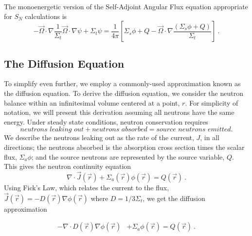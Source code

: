 The monoenergetic version of the Self-Adjoint Angular Flux equation appropriate for $S_N$ calculations is 
\begin{equation}
    - \vec{\Omega} \cdot \nabla \frac{1}{\Sigma_t}\vec{\Omega} \cdot \nabla \psi + \Sigma_t \psi = \frac{1}{4\pi}[\Sigma_s\phi + Q - \vec{\Omega} \cdot \nabla \frac{(\Sigma_s\phi + Q)}{\Sigma_t}]\:.
    \label{eq:SAAF}
\end{equation}


\subsection{The Diffusion Equation}
To simplify even further, we employ a commonly-used approximation known as the diffusion equation. To derive the diffusion equation, we consider the neutron balance within an infinitesimal volume centered at a point, $r$. For simplicity of notation, we will present this derivation assuming all neutrons have the same energy. Under steady state conditions, neutron conservation requires
%
\begin{equation}
    \textit{neutrons leaking out} + \textit{neutrons absorbed} = \textit{source neutrons emitted}.
\end{equation}
We describe the neutrons leaking out as the rate of the current, $J$, in all directions; the neutrons absorbed is the absorption cross section times the scalar flux, $\Sigma_a\phi$; and the source neutrons are represented by the source variable, $Q$. This gives the neutron continuity equation
\begin{equation}
    \nabla\cdot \vec{J}(\vec{r}) + \Sigma_a(\vec{r})\phi(\vec{r}) = Q(\vec{r})\:.
\end{equation}
Using Fick's Law, which relates the current to the flux, $\vec{J}(\vec{r}) = -D(\vec{r})\nabla\phi(\vec{r})$ where $D = 1/3\Sigma_t$, we get the diffusion approximation

\begin{equation}
\begin{split}
 - \nabla \cdot D(\vec{r})\nabla\phi(\vec{r}) &+ \Sigma_a \phi(\vec{r}) = Q(\vec{r})\:.
\end{split}
\label{eq:diffusion_fixed_source}
\end{equation}


